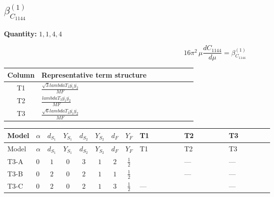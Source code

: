 \documentclass[8pt]{article}
\begin{document}
\begin{landscape}
\section*{$\beta_{C_{1144}}^{(1)}$}
\noindent\textbf{Quantity: }$\mathrm{1,1,4,4}$\par\smallskip
\[16\pi^2\,\mu\frac{d C_{1144}}{d\mu}=\beta_{C_{1144}}^{(1)}\]
\begin{center}
\begin{tabular}{@{}c >{\raggedright\arraybackslash}p{0.82\linewidth}@{}}
\toprule
Column & Representative term structure \\
\midrule
T1 & \(\displaystyle \frac{\sqrt{3} lambdaT_{3} \overline{y_{1}} \overline{y_{2}}}{MF}\) \\
\midrule
T2 & \(\displaystyle \frac{lambdaT_{3} \overline{y_{1}} \overline{y_{2}}}{MF}\) \\
\midrule
T3 & \(\displaystyle \frac{\sqrt{6} lambdaT_{3} \overline{y_{1}} \overline{y_{2}}}{MF}\) \\
\midrule
\bottomrule
\end{tabular}
\end{center}
\smallskip
\tiny
\begin{longtable}{@{}llcccccc >{\raggedright\arraybackslash}p{0.21\linewidth} >{\raggedright\arraybackslash}p{0.21\linewidth} >{\raggedright\arraybackslash}p{0.21\linewidth}@{}}
\toprule
Model & $\alpha$ & $d_{S_1}$ & $Y_{S_1}$ & $d_{S_2}$ & $Y_{S_2}$ & $d_F$ & $Y_F$ & T1 & T2 & T3 \\
\midrule
\endfirsthead
\toprule
Model & $\alpha$ & $d_{S_1}$ & $Y_{S_1}$ & $d_{S_2}$ & $Y_{S_2}$ & $d_F$ & $Y_F$ & T1 & T2 & T3 \\
\midrule
\endhead
T3-A & $0$ & $1$ & $0$ & $3$ & $1$ & $2$ & $\frac{1}{2}$ & \scriptsize\adjustbox{max width=\linewidth}{$\begin{gathered} - \frac{2 \sqrt{3} lambdaT_{3} \overline{y_{1}} \overline{y_{2}}}{3 MF}\end{gathered}$} & --- & --- \\
\midrule
T3-B & $0$ & $2$ & $0$ & $2$ & $1$ & $1$ & $\frac{1}{2}$ & \scriptsize\adjustbox{max width=\linewidth}{$\begin{gathered} - \frac{2 \sqrt{3} lambdaT_{3} \overline{y_{1}} \overline{y_{2}}}{3 MF}\end{gathered}$} & --- & --- \\
\midrule
T3-C & $0$ & $2$ & $0$ & $2$ & $1$ & $3$ & $\frac{1}{2}$ & --- & \scriptsize\adjustbox{max width=\linewidth}{$\begin{gathered} \frac{2 lambdaT_{3} \overline{y_{1}} \overline{y_{2}}}{3 MF}\end{gathered}$} & --- \\

\end{longtable}
\end{landscape}
\end{document}
